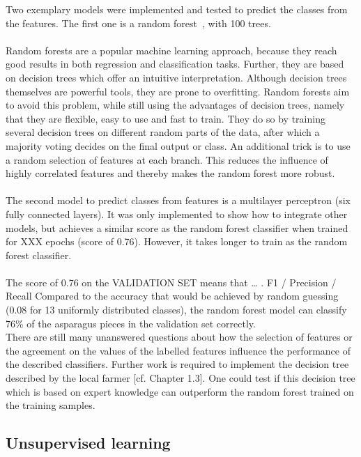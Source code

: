 Two exemplary models were implemented and tested to predict the classes from the features. The first one is a random forest~\citep{breiman2001random}, with 100 trees. \\
\\
Random forests are a popular machine learning approach, because they reach good results in both regression and classification tasks. Further, they are based on decision trees which offer an intuitive interpretation. Although decision trees themselves are powerful tools, they are prone to overfitting. Random forests aim to avoid this problem, while still using the advantages of decision trees, namely that they are flexible, easy to use and fast to train. They do so by training several decision trees on different random parts of the data, after which a majority voting decides on the final output or class. An additional trick is to use a random selection of features at each branch. This reduces the influence of highly correlated features and thereby makes the random forest more robust. \\
\\
The second model to predict classes from features is a multilayer perceptron (six fully connected layers). It was only implemented to show how to integrate other models, but achieves a similar score as the random forest classifier when trained for XXX epochs (score of 0.76). However, it takes longer to train as the random forest classifier. \\
\\
The score of 0.76 on the VALIDATION SET means that  … . F1 / Precision / Recall Compared to the accuracy that would be achieved by random guessing (0.08 for 13 uniformly distributed classes), the random forest model can classify 76\% of the asparagus pieces in the validation set correctly. \\
There are still many unanswered questions about how the selection of features or the agreement on the values of the labelled features influence the performance of the described classifiers. Further work is required to implement the decision tree described by the local farmer [cf. Chapter 1.3]. One could test if this decision tree which is based on expert knowledge can outperform the random forest trained on the training samples. 



\subsection{Unsupervised learning}
\label{sec:UnsupervisedLearning}

